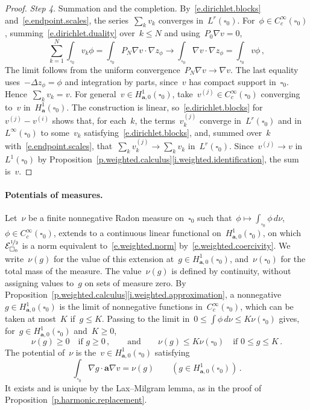 \documentclass[11pt,letterpaper]{article}
\numberwithin{equation}{section}
\theoremstyle{definition}
\renewcommand{\a}{\mathbf{a}}
\newcommand{\nf}{\nicefrac}
\newcommand{\cu}{\square}
\newcommand{\Ener}{\mathcal E}
\newcommand{\Hzero}[1]{H^1_{#1,0}}
\begin{document}
\begin{proof}
\smallskip

\emph{Step 4.} Summation and the completion. By~\eqref{e.dirichlet.blocks} and~\eqref{e.endpoint.scales}, the series~$\sum_kv_k$ converges in~$L^r(\cu_0)$. For~$\phi\in C^\infty_c(\cu_0)$, summing~\eqref{e.dirichlet.duality} over~$k\leq N$ and using~$P_0\nabla v=0$,
\begin{equation*}
	\sum_{k=1}^N\int_{\cu_0}v_k\phi=\int_{\cu_0}P_N\nabla v\cdot\nabla z_\phi\longrightarrow\int_{\cu_0}\nabla v\cdot\nabla z_\phi=\int_{\cu_0}v\phi\,,
\end{equation*}
The limit follows from the uniform convergence~$P_N\nabla v\to\nabla v$. The last equality uses~$-\Delta z_\phi=\phi$ and integration by parts, since~$v$ has compact support in~$\cu_0$. Hence~$\sum_kv_k=v$. For general~$v\in\Hzero{\a}(\cu_0)$, take~$v^{(j)}\in C^\infty_c(\cu_0)$ converging to~$v$ in~$H^1_\a(\cu_0)$. The construction is linear, so~\eqref{e.dirichlet.blocks} for~$v^{(j)}-v^{(i)}$ shows that, for each~$k$, the terms~$v_k^{(j)}$ converge in~$L^r(\cu_0)$ and in~$L^\infty(\cu_0)$ to some~$v_k$ satisfying~\eqref{e.dirichlet.blocks}, and, summed over~$k$ with~\eqref{e.endpoint.scales}, that~$\sum_kv_k^{(j)}\to\sum_kv_k$ in~$L^r(\cu_0)$. Since~$v^{(j)}\to v$ in~$L^1(\cu_0)$ by Proposition~\ref{p.weighted.calculus}\ref{i.weighted.identification}, the sum is~$v$.
\end{proof}

\paragraph{Potentials of measures.} Let~$\nu$ be a finite nonnegative Radon measure on~$\cu_0$ such that~$\phi\mapsto\int_{\cu_0}\phi\,d\nu$,~$\phi\in C^\infty_c(\cu_0)$, extends to a continuous linear functional on~$\Hzero{\a}(\cu_0)$, on which~$\Ener_{\cu_0}^{\nf12}$ is a norm equivalent to~\eqref{e.weighted.norm} by~\eqref{e.weighted.coercivity}. We write~$\nu(g)$ for the value of this extension at~$g\in\Hzero{\a}(\cu_0)$, and~$\nu(\cu_0)$ for the total mass of the measure. The value~$\nu(g)$ is defined by continuity, without assigning values to~$g$ on sets of measure zero. By Proposition~\ref{p.weighted.calculus}\ref{i.weighted.approximation}, a nonnegative~$g\in\Hzero{\a}(\cu_0)$ is the limit of nonnegative functions in~$C^\infty_c(\cu_0)$, which can be taken at most~$K$ if~$g\leq K$. Passing to the limit in~$0\leq\int\phi\,d\nu\leq K\nu(\cu_0)$ gives, for~$g\in\Hzero{\a}(\cu_0)$ and~$K\geq0$,
\begin{equation}
	\nu(g)\geq0\quad\mbox{if }g\geq0\,,\qquad\mbox{and}\qquad\nu(g)\leq K\nu(\cu_0)\quad\mbox{if }0\leq g\leq K\,.
	\label{e.measure.evaluation}
\end{equation}
The potential of~$\nu$ is the~$v\in\Hzero{\a}(\cu_0)$ satisfying
\begin{equation*}
	\int_{\cu_0}\nabla g\cdot\a\nabla v=\nu(g)\qquad(g\in\Hzero{\a}(\cu_0))\,.
\end{equation*}
It exists and is unique by the Lax--Milgram lemma, as in the proof of Proposition~\ref{p.harmonic.replacement}.
\end{document}
